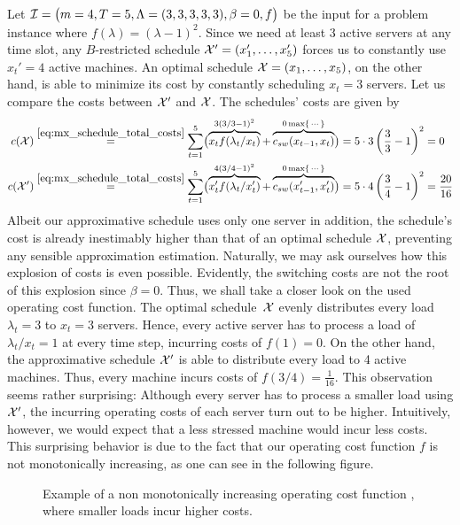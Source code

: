 \begin{exmpl}
Let $\mathcal{I}=\bigl(m=4,T=5,\Lambda=(3,3,3,3,3),\beta=0,f\bigr)$ be the input for a problem instance where $f(\lambda)=(\lambda-1)^2$. Since we need at least 3 active servers at any time slot, any $B$-restricted schedule $\mathcal{X}'=(x_1',\dotsc,x_5')$ forces us to constantly use $x_t'=4$ active machines. An optimal schedule $\mathcal{X}=(x_1,\dotsc,x_5)$, on the other hand, is able to minimize its cost by constantly scheduling $x_t=3$ servers. Let us compare the costs between $\mathcal{X}'$ and $\mathcal{X}$. The schedules' costs are given by
\begin{align*}
	c(\mathcal{X})&\stackrel{\eqref{eq:mx_schedule_total_costs}}{=}\sum\limits_{t=1}^{5}\bigl(\overbrace{x_tf(\lambda_t/x_t)}^{3(3/3-1)^2}+\overbrace{c_{sw}(x_{t-1},x_t)}^{0\max\{\,\cdots\}}\bigr)=5\cdot3\left(\frac{3}{3}-1\right)^2=0\\
	c(\mathcal{X}')&\stackrel{\eqref{eq:mx_schedule_total_costs}}{=}\sum\limits_{t=1}^{5}\bigl(\overbrace{x_t'f(\lambda_t/x_t')}^{4(3/4-1)^2}+\overbrace{c_{sw}(x_{t-1}',x_t')}^{0\max\{\,\cdots\}}\bigr)=5\cdot4\left(\frac{3}{4}-1\right)^2=\frac{20}{16} 
\end{align*}
Albeit our approximative schedule uses only one server in addition, the schedule's cost is already inestimably higher than that of an optimal schedule $\mathcal{X}$, preventing any sensible approximation estimation. Naturally, we may ask ourselves how this explosion of costs is even possible. Evidently, the switching costs are not the root of this explosion since $\beta=0$. Thus, we shall take a closer look on the used operating cost function. The optimal schedule~$\mathcal{X}$ evenly distributes every load $\lambda_t=3$ to $x_t=3$ servers. Hence, every active server has to process a load of $\lambda_t/x_t=1$ at every time step, incurring costs of $f(1)=0$. On the other hand, the approximative schedule $\mathcal{X}'$ is able to distribute every load to 4 active machines. Thus, every machine incurs costs of $f(3/4)=\frac{1}{16}$. This observation seems rather surprising: Although every server has to process a smaller load using $\mathcal{X}'$, the incurring operating costs of each server turn out to be higher. Intuitively, however, we would expect that a less stressed machine would incur less costs. This surprising behavior is due to the fact that our operating cost function $f$ is not monotonically increasing, as one can see in the following figure.
\begin{figure}[H]
\centering

\caption{Example of a non monotonically increasing operating cost function , where smaller loads incur higher costs.}
\label{fig:non_mono_incr_f}
\end{figure}
\end{exmpl}
